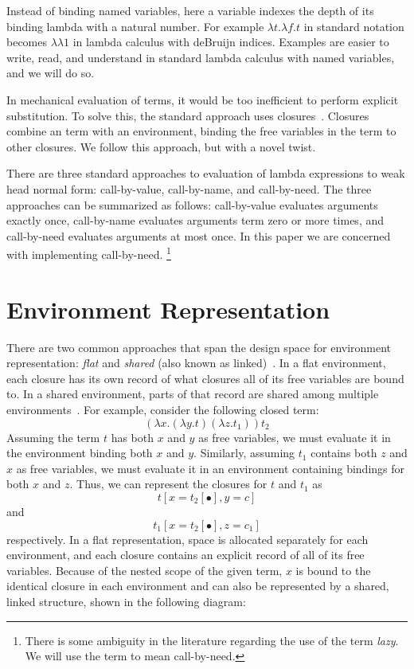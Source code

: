 \documentclass[preprint]{sigplanconf}
\begin{document}
Instead of binding named variables, here a variable indexes the depth of its
binding lambda with a natural number. For example $\lambda t.\lambda f.t$ in
standard notation becomes $\lambda\lambda1$ in lambda calculus with deBruijn
indices.  Examples are easier to write, read, and understand in standard lambda
calculus with named variables, and we will do so.

In mechanical evaluation of terms, it would be too inefficient to perform
explicit substitution. To solve this, the standard approach uses
closures~\cite{landin1964mechanical, curien1991abstract, jonesstg,
biernacka2007concrete}. Closures combine an term with an environment, binding
the free variables in the term to other closures. We follow this
approach, but with a novel twist. 

There are three standard approaches to evaluation of lambda expressions to weak
head normal form: call-by-value, call-by-name, and call-by-need. The three
approaches can be summarized as follows: call-by-value evaluates arguments
exactly once, call-by-name evaluates arguments term zero or more times, and
call-by-need evaluates arguments at most once. In this paper we are concerned
with implementing call-by-need. \footnote{There is some ambiguity in the
literature regarding the use of the term \emph{lazy}. We will use the term to
mean call-by-need.}

\section{Environment Representation} \label{sec:env}

There are two common approaches that span the design space for environment
representation: \emph{flat} and \emph{shared} (also
known as linked)~\cite{appel1988optimizing, shao1994space}. In a flat
environment, each closure has its own record of what closures all
of its free variables are bound to. In a shared environment, parts
of that record are shared among multiple environments~\cite{appel1988optimizing,
shao1994space}. For example, consider the following closed term: $$(\lambda
x.(\lambda y.t) (\lambda z.t_1)) t_2$$ Assuming the term $t$ has both $x$ and
$y$ as free variables, we must evaluate it in the environment binding both $x$
and $y$.  Similarly, assuming $t_1$ contains both $z$ and $x$ as free variables,
we must evaluate it in an environment containing bindings for both $x$ and $z$.
Thus, we can represent the closures for $t$ and $t_1$ as $$t[x=t_2[\bullet],
y=c]$$ and $$t_1[x=t_2[\bullet], z=c_1]$$ respectively. In a flat
representation, space is allocated separately for each environment, and each
closure contains an explicit record of all of its free variables. Because of the
nested scope of the given term, $x$ is bound to the identical closure in each
environment and can also be represented by a shared, linked structure, shown in
the following diagram:
\end{document}
